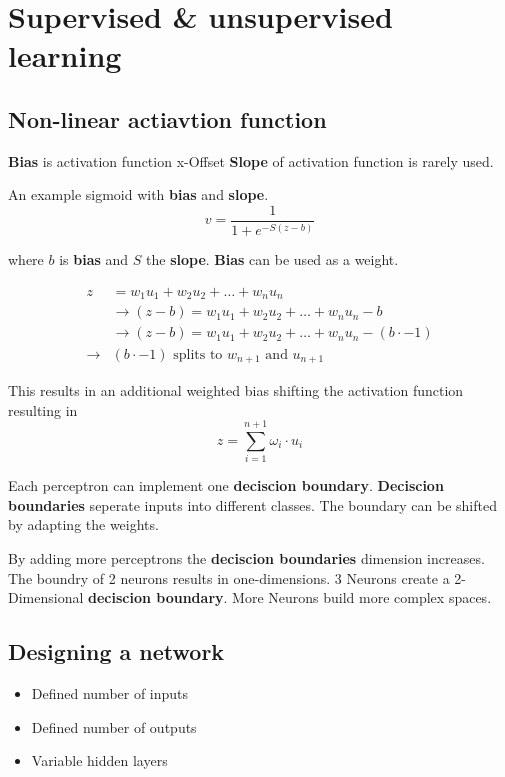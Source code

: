 \documentclass[
    fontsize      = 11pt,
    paper         = a4,
    twoside       = false,
    parskip       = half,
    pagesize      = false,
]{scrartcl}
\author{Robin Prillwitz}
\date{12. August 2022}
\providecommand{\tightlist}{%
  \setlength{\itemsep}{0pt}\setlength{\parskip}{0pt}}
\begin{document}
\hypertarget{supervised-unsupervised-learning}{%
\section{Supervised \& unsupervised
learning}\label{supervised-unsupervised-learning}}

\hypertarget{non-linear-actiavtion-function}{%
\subsection{Non-linear actiavtion
function}\label{non-linear-actiavtion-function}}

\textbf{Bias} is activation function x-Offset \textbf{Slope} of
activation function is rarely used.

An example sigmoid with \textbf{bias} and \textbf{slope}.
\[v =  \frac{1}{1+e^{-S(z-b)}}\]

where \(b\) is \textbf{bias} and \(S\) the \textbf{slope}. \textbf{Bias}
can be used as a weight.

\begin{align*}
z &= w_1u_1 + w_2u_2 + \ldots + w_nu_n \\
& \rightarrow (z-b) = w_1u_1 + w_2u_2 + \ldots + w_nu_n - b\\
& \rightarrow (z-b) = w_1u_1 + w_2u_2 + \ldots + w_nu_n - (b \cdot -1)\\[2ex]
\rightarrow & (b \cdot -1) \text{ splits to } w_{n+1} \text{ and } u_{n+1}
\end{align*}

This results in an additional weighted bias shifting the activation
function resulting in \[z = \sum_{i=1}^{n+1}\omega_i \cdot u_i\]

Each perceptron can implement one \textbf{deciscion boundary}.
\textbf{Deciscion boundaries} seperate inputs into different classes.
The boundary can be shifted by adapting the weights.

By adding more perceptrons the \textbf{deciscion boundaries} dimension
increases. The boundry of 2 neurons results in one-dimensions. 3 Neurons
create a 2-Dimensional \textbf{deciscion boundary}. More Neurons build
more complex spaces.

\hypertarget{designing-a-network}{%
\subsection{Designing a network}\label{designing-a-network}}

\begin{itemize}
\tightlist
\item
  Defined number of inputs
\item
  Defined number of outputs
\item
  Variable hidden layers
\end{itemize}
\end{document}
